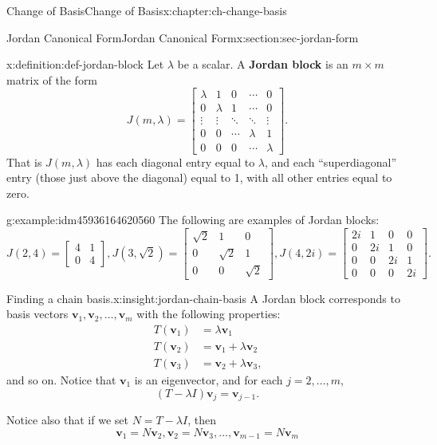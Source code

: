 \documentclass[oneside,10pt,]{book}
\newcommand{\terminology}[1]{\textbf{#1}}
\numberwithin{equation}{section}
\newcommand{\bbm}{\begin{bmatrix}}
\newcommand{\ebm}{\end{bmatrix}}
\newcommand{\vv}{\mathbf{v}}
\newcommand{\amp}{&}
\begin{document}
\begin{chapterptx}{Change of Basis}{}{Change of Basis}{}{}{x:chapter:ch-change-basis}
\begin{sectionptx}{Jordan Canonical Form}{}{Jordan Canonical Form}{}{}{x:section:sec-jordan-form}
\begin{definition}{}{x:definition:def-jordan-block}
Let \(\lambda\) be a scalar. A \terminology{Jordan block} is an \(m\times m\) matrix of the form%
\begin{equation*}
J(m,\lambda) = \bbm \lambda \amp 1 \amp 0 \amp \cdots \amp 0\\
0 \amp \lambda \amp 1 \amp \cdots \amp 0\\
\vdots \amp \vdots \amp \ddots \amp \ddots \amp \vdots\\
0 \amp 0 \amp \cdots \amp \lambda \amp 1\\
0 \amp 0 \amp 0 \amp \cdots \amp \lambda\ebm\text{.}
\end{equation*}
That is \(J(m,\lambda)\) has each diagonal entry equal to \(\lambda\), and each ``superdiagonal'' entry (those just above the diagonal) equal to 1, with all other entries equal to zero.%
\end{definition}
\begin{example}{}{g:example:idm45936164620560}%
The following are examples of Jordan blocks:%
\begin{equation*}
J(2,4)=\bbm 4 \amp 1\\ 0\amp 4\ebm, J(3,\sqrt{2})=\bbm \sqrt{2} \amp 1\amp 0\\0\amp \sqrt{2}\amp 1\\0\amp 0\amp \sqrt{2}\ebm,
J(4,2i)=\bbm 2i \amp 1\amp 0\amp 0\\0\amp 2i\amp 1\amp 0\\0\amp 0\amp 2i\amp 1\\0\amp 0\amp 0\amp 2i\ebm\text{.}
\end{equation*}
%
\end{example}
\begin{insight}{Finding a chain basis.}{x:insight:jordan-chain-basis}%
A Jordan block corresponds to basis vectors \(\vv_1,\vv_2,\ldots, \vv_m\) with the following properties:%
\begin{align*}
T(\vv_1) \amp = \lambda \vv_1\\
T(\vv_2) \amp = \vv_1+\lambda \vv_2\\
T(\vv_3) \amp = \vv_2+\lambda \vv_3\text{,}
\end{align*}
and so on. Notice that \(\vv_1\) is an eigenvector, and for each \(j=2,\ldots, m\),%
\begin{equation*}
(T-\lambda I)\vv_{j} = \vv_{j-1}\text{.}
\end{equation*}
%
\par
Notice also that if we set \(N=T-\lambda I\), then%
\begin{equation*}
\vv_1 = N\vv_2, \vv_2 = N\vv_3, \ldots, \vv_{m-1} = N\vv_m

\end{equation*}
\end{insight}
\end{sectionptx}
\end{chapterptx}
\end{document}
